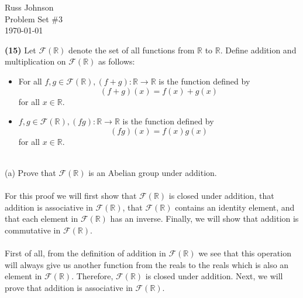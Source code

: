\documentclass[11pt,a4paper]{article}
\begin{document}
\begin{flushright}
Russ Johnson\\
Problem Set $\#3$\\
\today\\
\end{flushright}

{\bf (15)} Let $\mathcal{F}(\mathbb{R})$ denote the set of all functions from $\mathbb{R}$ to $\mathbb{R}$. Define addition and multiplication on $\mathcal{F}(\mathbb{R})$ as follows:
\begin{itemize}
\item For all $f,g \in \mathcal{F}(\mathbb{R}), (f + g) :\mathbb{R} \rightarrow \mathbb{R}$ is the function defined by
\[(f+g)(x) = f(x)+g(x)\]
for all $x\in\mathbb{R}$.
\item $f,g \in \mathcal{F}(\mathbb{R}), (fg) :\mathbb{R} \rightarrow \mathbb{R}$ is the function defined by
\[(fg)(x) = f(x)g(x)\]
for all $x\in\mathbb{R}$.
\end{itemize}
~\\
(a) Prove that $\mathcal{F}(\mathbb{R})$ is an Abelian group under addition.\\
~\\
For this proof we will first show that $\mathcal{F}(\mathbb{R})$ is closed under addition, that addition is associative in $\mathcal{F}(\mathbb{R})$, that $\mathcal{F}(\mathbb{R})$ contains an identity element, and that each element in $\mathcal{F}(\mathbb{R})$ has an inverse. Finally, we will show that addition is commutative in $\mathcal{F}(\mathbb{R})$.\\
~\\
First of all, from the definition of addition in $\mathcal{F}(\mathbb{R})$ we see that this operation will always give us another function from the reals to the reals which is also an element in $\mathcal{F}(\mathbb{R})$. Therefore, $\mathcal{F}(\mathbb{R})$ is closed under addition. Next, we will prove that  addition is associative in $\mathcal{F}(\mathbb{R})$.
\end{document}
